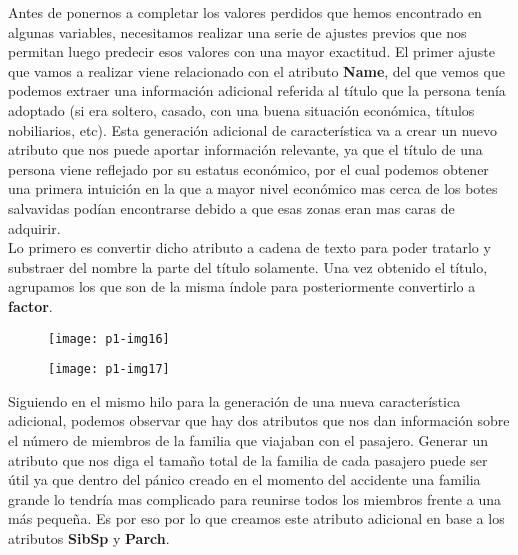 \documentclass[10pt]{article}
\begin{document}
Antes de ponernos a completar los valores perdidos que hemos encontrado en algunas variables, necesitamos realizar una serie de ajustes previos que nos permitan luego predecir esos valores con una mayor exactitud. El primer ajuste que vamos a realizar viene relacionado con el atributo \textbf{Name}, del que vemos que podemos extraer una información adicional referida al título que la persona tenía adoptado (si era soltero, casado, con una buena situación económica, títulos nobiliarios, etc). Esta generación adicional de característica va a crear un nuevo atributo que nos puede aportar información relevante, ya que el título de una persona viene reflejado por su estatus económico, por el cual podemos obtener una primera intuición en la que a mayor nivel económico mas cerca de los botes salvavidas podían encontrarse debido a que esas zonas eran mas caras de adquirir. \\

Lo primero es convertir dicho atributo a cadena de texto para poder tratarlo y substraer del nombre la parte del título solamente. Una vez obtenido el título, agrupamos los que son de la misma índole para posteriormente convertirlo a \textbf{factor}. \\

\begin{figure}[H]
	\begin{center}
 		\texttt{[image: p1-img16]}
	\end{center} 
\end{figure}

\begin{figure}[H]
	\begin{center}
 		\texttt{[image: p1-img17]}
	\end{center} 
\end{figure}


Siguiendo en el mismo hilo para la generación de una nueva característica adicional, podemos observar que hay dos atributos que nos dan información sobre el número de miembros de la familia que viajaban con el pasajero. Generar un atributo que nos diga el tamaño total de la familia de cada pasajero puede ser útil ya que dentro del pánico creado en el momento del accidente una familia grande lo tendría mas complicado para reunirse todos los miembros frente a una más pequeña. Es por eso por lo que creamos este atributo adicional en base a los atributos \textbf{SibSp} y \textbf{Parch}.
\end{document}
